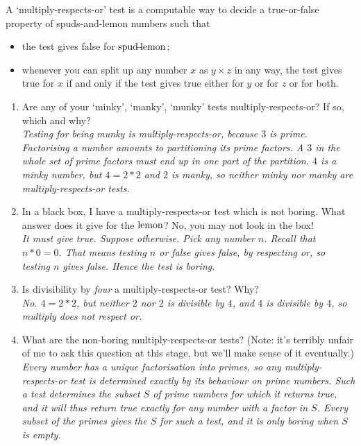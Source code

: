 \documentclass{book}
\begin{document}
\begin{sol}
  A `multiply-respects-or' test is a computable way to decide a true-or-false property of spuds-and-lemon numbers such that
  \begin{itemize}
  \item the test gives false for $\mbox{spud}\!\!\!-\!\!\!\mbox{lemon}$;
  \item whenever you can split up any number $x$ as $y\times z$ in any way, the test gives true for $x$ if and only if the test gives true either for $y$ or for $z$ or for both.
  \end{itemize}
  \begin{enumerate}
  \item Are any of your `minky', `manky', `munky' tests multiply-respects-or? If so, which and why?\\
    \emph{Testing for being munky is multiply-respects-or, because $3$ is prime.
    Factorising a number amounts to partitioning its prime factors. A $3$ in the whole set of prime factors must end up in one part of the partition. $4$ is a minky number, but $4 = 2*2$ and $2$ is manky, so neither minky nor manky are multiply-respects-or tests.}
  \item In a black box, I have a multiply-respects-or test which is not boring. What answer does it give for the $\mbox{lemon}$? No, you may not look in the box!\\
    \emph{It must give true. Suppose otherwise. Pick any number $n$. Recall that $n*0 = 0$.
    That means testing $n$ or false gives false, by respecting or, so testing $n$ gives false. Hence the test is boring.}
  \item Is divisibility by \emph{four} a multiply-respects-or test? Why?\\
    \emph{No. $4 = 2*2$, but neither $2$ nor $2$ is divisible by $4$, and $4$ is divisible by $4$, so multiply does not respect or.}
  \item What are the non-boring multiply-respects-or tests? (Note: it's terribly unfair of me to ask this question at this stage, but we'll make sense of it eventually.)\\
    \emph{Every number has a unique factorisation into primes, so any multiply-respects-or test is determined exactly by its behaviour on prime numbers. Such a test determines the subset $S$ of prime numbers for which it returns true, and it will thus return true exactly for any number with a factor in $S$. Every subset of the primes gives the $S$ for such a test, and it is only boring when $S$ is empty.}
  \end{enumerate}
\end{sol}
\end{document}
